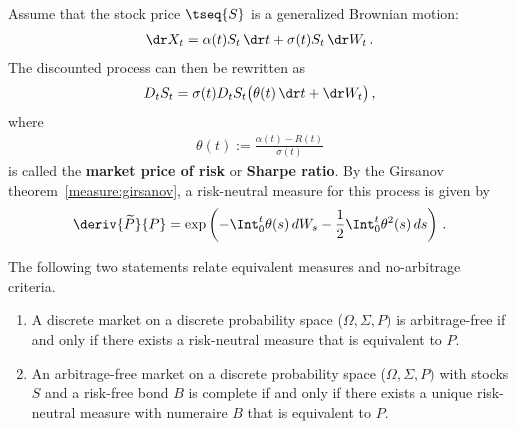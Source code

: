     \begin{example}
        Assume that the stock price $\tseq{S}$ is a generalized Brownian motion:
        \begin{gather}
            \dr X_t = \alpha(t)S_t\,\dr t + \sigma(t)S_t\,\dr W_t\,.
        \end{gather}
        The discounted process can then be rewritten as
        \begin{gather}
            D_tS_t = \sigma(t)D_tS_t\bigl(\theta(t)\,\dr t + \dr W_t\bigr)\,,
        \end{gather}
        where
        \begin{gather}
            \theta(t) := \frac{\alpha(t) - R(t)}{\sigma(t)}
        \end{gather}
        is called the \textbf{market price of risk} or \textbf{Sharpe ratio}. By the Girsanov theorem~\ref{measure:girsanov}, a risk-neutral measure for this process is given by
        \begin{gather}
            \deriv{\widetilde{P}}{P} = \exp\left(-\Int_0^t\theta(s)\,dW_s - \frac{1}{2}\Int_0^t\theta^2(s)\,ds\right)\,.
        \end{gather}
    \end{example}

    \begin{theorem}
        The following two statements relate equivalent measures and no-arbitrage criteria.
        \begin{enumerate}
            \item A discrete market on a discrete probability space ($\Omega,\Sigma,P)$ is arbitrage-free if and only if there exists a risk-neutral measure that is equivalent to $P$.
            \item An arbitrage-free market on a discrete probability space ($\Omega,\Sigma,P)$ with stocks $S$ and a risk-free bond $B$ is complete if and only if there exists a unique risk-neutral measure with numeraire $B$ that is equivalent to $P$.
        \end{enumerate}
    \end{theorem}

    \begin{theorem}
    \end{theorem}
